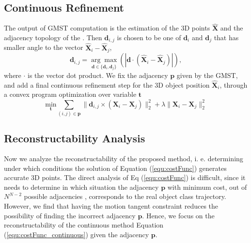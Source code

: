 \subsection{Continuous Refinement}
The output of GMST computation is the estimation of the 3D points $\mathbf{\widehat{X}}$ and the adjacency topology of the \oct. Then $\mathbf{d}_{i,j}$ is chosen to be one of $\mathbf{d}_i$ and $\mathbf{d}_j$  that has smaller angle to the vector $\mathbf{\widehat{X}}_i - \mathbf{\widehat{X}}_j$,
\begin{equation}
\mathbf{d}_{i,j}= \underset{\mathbf{d}\in{\{\mathbf{d}_i, \mathbf{d}_j}\} }{\arg\!\max}(|\mathbf{d} \cdot (\mathbf{\widehat{X}}_i - \mathbf{\widehat{X}}_j)| ),
\end{equation}
where $\cdot$ is the vector dot product.
We fix the adjacency $\mathbf{p}$ given by the GMST, and add a final continuous refinement step for the 3D object position $\mathbf{\hat{X}}_i$, through a convex program optimization over variable $\mathbf{t}$
\begin{equation}
\underset{\mathbf{t}} { \text{min} }
\sum_{(i,j)\in{\mathbf{p}}}{\|\mathbf{d}_{i,j}\times(\mathbf{X}_i-\mathbf{X}_j)\|_2^2 + \lambda\|\mathbf{X}_i-\mathbf{X}_j\|_2^2}
\label{equ:costFunc_continuous}
\end{equation}

\subsection{Reconstructability Analysis} \label{sec:analysis}

Now we analyze the reconstructability of the proposed method, i. e. determining under which conditions the solution of Equation (\ref{equ:costFunc}) generates accurate 3D points. The direct analysis of Eq (\ref{equ:costFunc}) is difficult, since it needs to determine in which situation the adjacency $\mathbf{p}$ with minimum cost, out of $N^{N-2}$ possible adjacencies \cite{wiki_cayley_alg}, corresponds to the real object class trajectory.
However, we find that having the motion tangent constraint reduces the possibility of finding the incorrect adjacency $\mathbf{p}$. 
Hence, we focus on  the reconstructability of the continuous method Equation (\ref{equ:costFunc_continuous}) given the adjacency $\mathbf{p}$.

